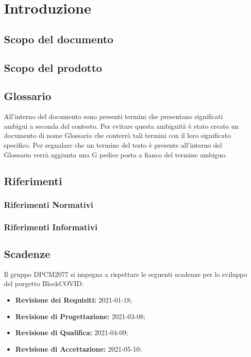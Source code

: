 \section{Introduzione}

\subsection{Scopo del documento}

\subsection{Scopo del prodotto}

\subsection{Glossario}
All’interno del  documento sono presenti termini che presentano significati ambigui a seconda del contesto.
Per evitare questa ambiguità è stato creato un  documento di nome Glossario che  conterrà tali termini con il loro significato specifico. Per segnalare che un termine del testo è presente all’interno del Glossario  
verrà aggiunta una G pedice posta a fianco del termine ambiguo. 

\subsection{Riferimenti}
\subsubsection{Riferimenti Normativi}


\subsubsection{Riferimenti Informativi}


\subsection{Scadenze}
Il gruppo DPCM2077 si impegna a rispettare le seguenti scadenze per lo sviluppo del porgetto BlockCOVID:
\begin{itemize}
	\item \textbf{Revisione dei Requisiti:} 2021-01-18; \\
	\item \textbf{Revisione di Progettazione:} 2021-03-08; \\
	\item \textbf{Revisione di Qualifica:} 2021-04-09; \\
	\item \textbf{Revisione di Accettazione:} 2021-05-10; \\
	
\end{itemize}




